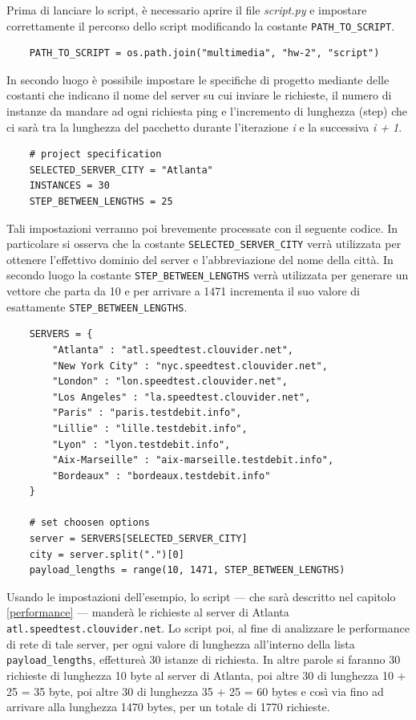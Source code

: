 Prima di lanciare lo script, è necessario aprire il file \textsl{script.py} e impostare correttamente il percorso dello script modificando la costante \texttt{PATH\_TO\_SCRIPT}.
\begin{lstlisting}
    PATH_TO_SCRIPT = os.path.join("multimedia", "hw-2", "script")
\end{lstlisting}

\noindent In secondo luogo è possibile impostare le specifiche di progetto mediante delle costanti che indicano il nome del server su cui inviare le richieste, il numero di instanze da mandare ad ogni richiesta ping e l'incremento di lunghezza (step) che ci sarà tra la lunghezza del pacchetto durante l'iterazione \textit{i} e la successiva \textit{i + 1}.

\begin{lstlisting}
    # project specification
    SELECTED_SERVER_CITY = "Atlanta"
    INSTANCES = 30
    STEP_BETWEEN_LENGTHS = 25
\end{lstlisting}

\noindent Tali impostazioni verranno poi brevemente processate con il seguente codice. In particolare si osserva che la costante \texttt{SELECTED\_SERVER\_CITY} verrà utilizzata per ottenere l'effettivo dominio del server e l'abbreviazione del nome della città. In secondo luogo la costante \texttt{STEP\_BETWEEN\_LENGTHS} verrà utilizzata per generare un vettore che parta da 10 e per arrivare a 1471 incrementa il suo valore di esattamente \texttt{STEP\_BETWEEN\_LENGTHS}.

\begin{lstlisting}
    SERVERS = {
        "Atlanta" : "atl.speedtest.clouvider.net",
        "New York City" : "nyc.speedtest.clouvider.net", 
        "London" : "lon.speedtest.clouvider.net", 
        "Los Angeles" : "la.speedtest.clouvider.net", 
        "Paris" : "paris.testdebit.info", 
        "Lillie" : "lille.testdebit.info", 
        "Lyon" : "lyon.testdebit.info", 
        "Aix-Marseille" : "aix-marseille.testdebit.info", 
        "Bordeaux" : "bordeaux.testdebit.info"
    }

    # set choosen options
    server = SERVERS[SELECTED_SERVER_CITY]
    city = server.split(".")[0]
    payload_lengths = range(10, 1471, STEP_BETWEEN_LENGTHS)
\end{lstlisting}

\noindent Usando le impostazioni dell'esempio, lo script — che sarà descritto nel capitolo\,\ref{performance} — manderà le richieste al server di Atlanta \texttt{atl.speedtest.clouvider.net}. Lo script poi, al fine di analizzare le performance di rete di tale server, per ogni valore di lunghezza all'interno della lista \texttt{payload\_lengths}, effettureà 30 istanze di richiesta. In altre parole si faranno 30 richieste di lunghezza 10 byte al server di Atlanta, poi altre 30 di lunghezza 10 + 25 = 35 byte, poi altre 30 di lunghezza 35 + 25 = 60 bytes e così via fino ad arrivare alla lunghezza 1470 bytes, per un totale di 1770 richieste.




